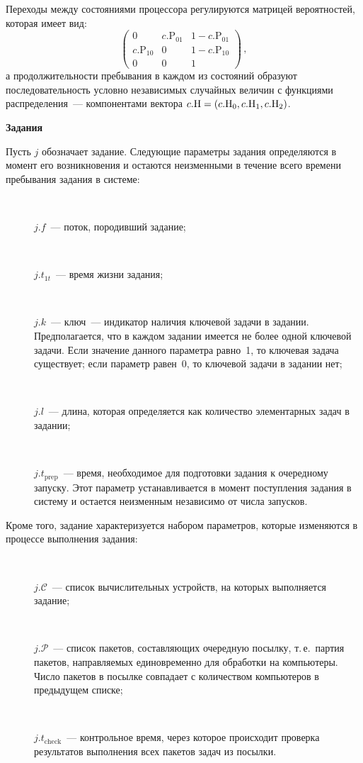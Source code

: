 \begin{multicols}{2}
    Переходы между состояниями процессора регулируются мат\-ри\-цей 
вероятностей, которая имеет вид:
    $$
    \begin{pmatrix}
    0 & c.\mathrm{P}_{01} & 1-c.\mathrm{P}_{01}\\
    c.\mathrm{P}_{10} & 0 & 1-c.\mathrm{P}_{10}\\
    0 & 0 & 1
    \end{pmatrix}\,,
    $$
а продолжительности пребывания в каждом из состояний образуют 
последовательность условно независимых случайных величин с функциями 
распределения~--- компонентами вектора $c.\mathrm{H}\hm=(c.\mathrm{H}_0, c.\mathrm{H}_1, c.\mathrm{H}_2)$.

\medskip
\textbf{Задания}
\smallskip

    Пусть $j$ обозначает задание. Следующие параметры задания 
определяются в момент его возникновения и остаются неизменными в 
течение всего времени пребывания задания в системе:
    \begin{description}
    \item[\,] $j.f$~--- поток, породивший задание;
    \item[\,] $j.t_{1t}$~--- время жизни задания;
    \item[\,] $j.k$~--- ключ~--- индикатор наличия ключевой задачи в 
задании. Предполагается, что в каждом задании имеется не более одной 
ключевой задачи. Если значение данного параметра равно~1, то ключевая 
задача существует; если параметр равен~0, то ключевой задачи в задании 
нет;
    \item[\,] $j.l$~--- длина, которая определяется как количество 
элементарных задач в задании;
    \item[\,] $j.t_{\mathrm{prep}}$~--- время, необходимое для подготовки 
задания к очередному запуску. Этот параметр устанавливается в момент 
поступления задания в систему и остается неизменным независимо от числа 
запусков.
    \end{description}
    
    Кроме того, задание характеризуется набором параметров, которые 
изменяются в процессе выполнения задания:
    \begin{description}
    \item[\,] $j.\mathcal{C}$~--- список вычислительных устройств, на которых 
выполняется задание;
    \item[\,] $j.\mathcal{P}$~--- список пакетов, составляющих очередную посылку, т.\,е.\ 
    партия пакетов, направляемых единовременно для обработки на 
компьютеры. Число пакетов в посылке совпадает с количеством 
компьютеров в предыдущем списке;
    \item[\,] $j.t_{\mathrm{check}}$~---  контрольное время, через которое 
происходит проверка результатов выполнения всех пакетов задач из 
посылки.
    \end{description}


\end{multicols}
